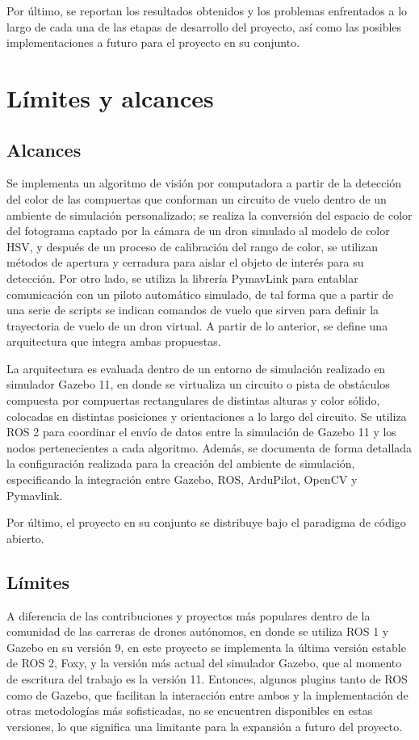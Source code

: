Por último, se reportan los resultados obtenidos y los problemas enfrentados a lo largo de cada una de las etapas de desarrollo del proyecto, así como las posibles implementaciones a futuro para el proyecto en su conjunto.



\section{Límites y alcances}

\subsection{Alcances}
Se implementa un algoritmo de visión por computadora a partir de la detección del color de las compuertas que conforman un circuito de vuelo dentro de un ambiente de simulación personalizado; se realiza la conversión del espacio de color del fotograma captado por la cámara de un dron simulado al modelo de color HSV, y después de un proceso de calibración del rango de color, se utilizan métodos de apertura y cerradura para aislar el objeto de interés para su detección. Por otro lado, se utiliza la librería PymavLink para entablar comunicación con un piloto automático simulado, de tal forma que a partir de una serie de scripts se indican comandos de vuelo que sirven para definir la trayectoria de vuelo de un dron virtual. A partir de lo anterior, se define una arquitectura que integra ambas propuestas.  

La arquitectura es evaluada dentro de un entorno de simulación realizado en simulador Gazebo 11, en donde se virtualiza un circuito o pista de obstáculos compuesta por compuertas rectangulares de distintas alturas y color sólido, colocadas en distintas posiciones y orientaciones a lo largo del circuito. Se utiliza ROS 2 para coordinar el envío de datos entre la simulación de Gazebo 11 y los nodos pertenecientes a cada algoritmo. Además, se documenta de forma detallada la configuración realizada para la creación del ambiente de simulación, especificando la integración entre Gazebo, ROS, ArduPilot, OpenCV y Pymavlink. 

Por último, el proyecto en su conjunto se distribuye bajo el paradigma de código abierto.

\subsection{Límites}
A diferencia de las contribuciones y proyectos más populares dentro de la comunidad de las carreras de drones autónomos, en donde se utiliza ROS 1 y Gazebo en su versión 9, en este proyecto se implementa la última versión estable de ROS 2, Foxy, y la versión más actual del simulador Gazebo, que al momento de escritura del trabajo es la versión 11. Entonces, algunos plugins tanto de ROS como de Gazebo, que facilitan la interacción entre ambos y la implementación de otras metodologías más sofisticadas, no se encuentren disponibles en estas versiones, lo que significa una limitante para la expansión a futuro del proyecto. 

